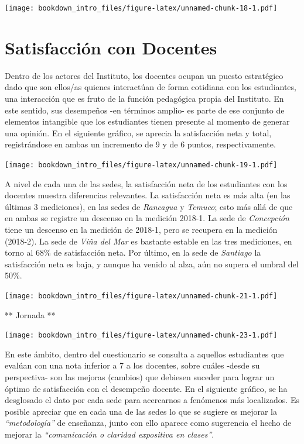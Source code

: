 \documentclass[]{book}
\begin{document}
\texttt{[image: bookdown\_intro\_files/figure-latex/unnamed-chunk-18-1.pdf]}

\section{Satisfacción con Docentes}\label{satisfaccion-con-docentes}

Dentro de los actores del Instituto, los docentes ocupan un puesto
estratégico dado que son ellos/as quienes interactúan de forma cotidiana
con los estudiantes, una interacción que es fruto de la función
pedagógica propia del Instituto. En este sentido, sus desempeños -en
términos amplio- es parte de ese conjunto de elementos intangible que
los estudiantes tienen presente al momento de generar una opinión. En el
siguiente gráfico, se aprecia la satisfacción neta y total,
registrándose en ambas un incremento de 9 y de 6 puntos,
respectivamente.

\texttt{[image: bookdown\_intro\_files/figure-latex/unnamed-chunk-19-1.pdf]}

A nivel de cada una de las sedes, la satisfacción neta de los
estudiantes con los docentes muestra diferencias relevantes. La
satisfacción neta es más alta (en las últimas 3 mediciones), en las
sedes de \emph{Rancagua} y \emph{Temuco}; esto más allá de que en ambas
se registre un descenso en la medición 2018-1. La sede de
\emph{Concepción} tiene un descenso en la medición de 2018-1, pero se
recupera en la medición (2018-2). La sede de \emph{Viña del Mar} es
bastante estable en las tres mediciones, en torno al 68\% de
satisfacción neta. Por último, en la sede de \emph{Santiago} la
satisfacción neta es baja, y aunque ha venido al alza, aún no supera el
umbral del 50\%.

\texttt{[image: bookdown\_intro\_files/figure-latex/unnamed-chunk-21-1.pdf]}

** Jornada **

\texttt{[image: bookdown\_intro\_files/figure-latex/unnamed-chunk-23-1.pdf]}

En este ámbito, dentro del cuestionario se consulta a aquellos
estudiantes que evalúan con una nota inferior a 7 a los docentes, sobre
cuáles -desde su perspectiva- son las mejoras (cambios) que debiesen
suceder para lograr un óptimo de satisfacción con el desempeño docente.
En el siguiente gráfico, se ha desglosado el dato por cada sede para
acercarnos a fenómenos más localizados. Es posible apreciar que en cada
una de las sedes lo que se sugiere es mejorar la \emph{``metodología''}
de enseñanza, junto con ello aparece como sugerencia el hecho de mejorar
la \emph{``comunicación o claridad expositiva en clases''}.
\end{document}
